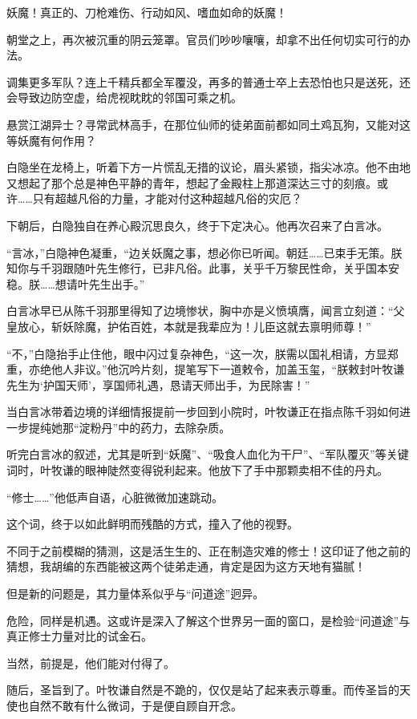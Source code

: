 妖魔！真正的、刀枪难伤、行动如风、嗜血如命的妖魔！

\vspace{2em}

朝堂之上，再次被沉重的阴云笼罩。官员们吵吵嚷嚷，却拿不出任何切实可行的办法。

调集更多军队？连上千精兵都全军覆没，再多的普通士卒上去恐怕也只是送死，还会导致边防空虚，给虎视眈眈的邻国可乘之机。

悬赏江湖异士？寻常武林高手，在那位仙师的徒弟面前都如同土鸡瓦狗，又能对这等妖魔有何作用？

白隐坐在龙椅上，听着下方一片慌乱无措的议论，眉头紧锁，指尖冰凉。他不由地又想起了那个总是神色平静的青年，想起了金殿柱上那道深达三寸的刻痕。或许……只有超越凡俗的力量，才能对付这种超越凡俗的灾厄？

下朝后，白隐独自在养心殿沉思良久，终于下定决心。他再次召来了白言冰。

“言冰，”白隐神色凝重，“边关妖魔之事，想必你已听闻。朝廷……已束手无策。朕知你与千羽跟随叶先生修行，已非凡俗。此事，关乎千万黎民性命，关乎国本安稳。朕……想请叶先生出手。”

白言冰早已从陈千羽那里得知了边境惨状，胸中亦是义愤填膺，闻言立刻道：“父皇放心，斩妖除魔，护佑百姓，本就是我辈应为！儿臣这就去禀明师尊！”

“不，”白隐抬手止住他，眼中闪过复杂神色，“这一次，朕需以国礼相请，方显郑重，亦绝他人非议。”他沉吟片刻，提笔写下一道敕令，加盖玉玺，“朕敕封叶牧谦先生为‘护国天师’，享国师礼遇，恳请天师出手，为民除害！”

当白言冰带着边境的详细情报提前一步回到小院时，叶牧谦正在指点陈千羽如何进一步提纯她那“淀粉丹”中的药力，去除杂质。

听完白言冰的叙述，尤其是听到“妖魔”、“吸食人血化为干尸”、“军队覆灭”等关键词时，叶牧谦的眼神陡然变得锐利起来。他放下了手中那颗卖相不佳的丹丸。

“修士……”他低声自语，心脏微微加速跳动。

这个词，终于以如此鲜明而残酷的方式，撞入了他的视野。

不同于之前模糊的猜测，这是活生生的、正在制造灾难的修士！这印证了他之前的猜想，我胡编的东西能被这两个徒弟走通，肯定是因为这方天地有猫腻！

但是新的问题是，其力量体系似乎与“问道途”迥异。

危险，同样是机遇。这或许是深入了解这个世界另一面的窗口，是检验“问道途”与真正修士力量对比的试金石。

当然，前提是，他们能对付得了。

随后，圣旨到了。叶牧谦自然是不跪的，仅仅是站了起来表示尊重。而传圣旨的天使也自然不敢有什么微词，于是便自顾自开念。

